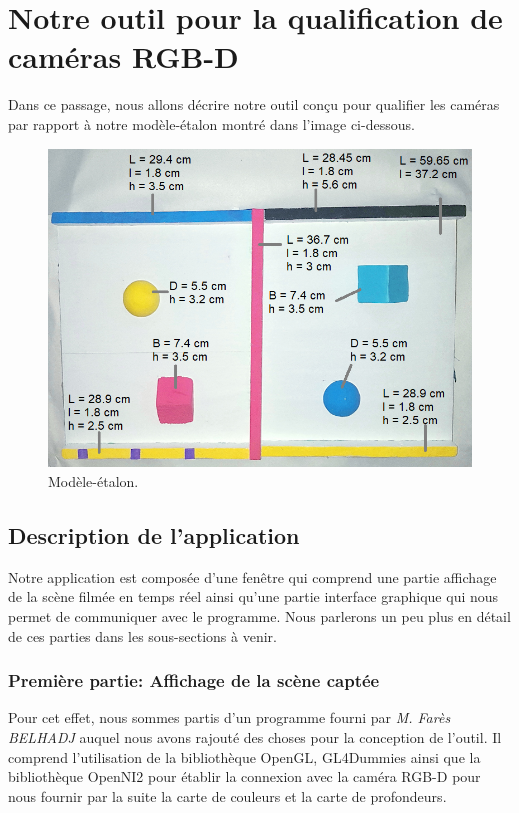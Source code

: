 \documentclass[a4paper, 12pt]{book}
\newcounter{program}[subsection]
\begin{document}
\chapter[Notre outil pour la qualification]{Notre outil pour la qualification de caméras RGB-D}
Dans ce passage, nous allons décrire notre outil conçu pour qualifier les caméras par rapport à notre modèle-étalon montré dans l'image ci-dessous.

\begin{figure}[htbp]
  \hspace{0.75cm}
 \includegraphics[scale=0.5]{images/realModel.png} \hspace{2cm}
  \caption{Modèle-étalon.\label{fig-model}}
\end{figure}

\section{Description de l'application}
Notre application est composée d'une fenêtre qui comprend une partie affichage de la scène filmée en temps réel ainsi qu'une partie interface graphique qui nous permet de communiquer avec le programme. Nous parlerons un peu plus en détail de ces parties dans les sous-sections à venir.
\subsection{Première partie: Affichage de la scène captée }
Pour cet effet, nous sommes partis d'un programme fourni par \emph{M. Farès BELHADJ} auquel nous avons rajouté des choses pour la conception de l'outil. Il comprend l'utilisation de la bibliothèque OpenGL, GL4Dummies ainsi que la bibliothèque OpenNI2 pour établir la connexion avec la caméra RGB-D pour nous fournir par la suite la carte de couleurs et la carte de profondeurs.
\end{document}
